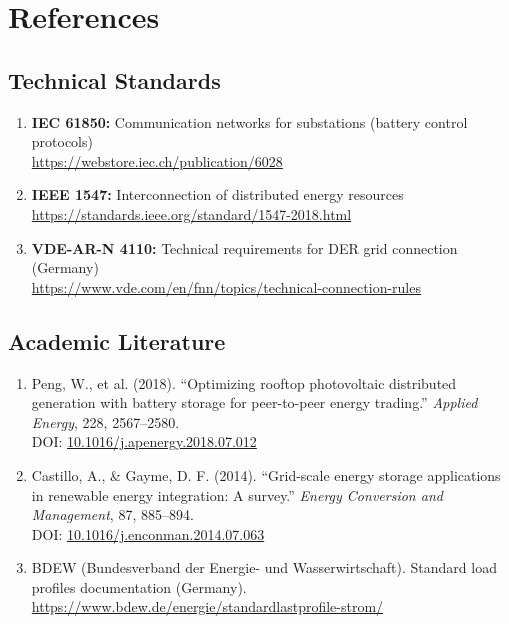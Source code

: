 \documentclass[11pt,a4paper]{article}
\begin{document}
\section{References}

\subsection{Technical Standards}

\begin{enumerate}
    \item \textbf{IEC 61850:} Communication networks for substations (battery control protocols) \\
    \href{https://webstore.iec.ch/publication/6028}{https://webstore.iec.ch/publication/6028}
    
    \item \textbf{IEEE 1547:} Interconnection of distributed energy resources \\
    \href{https://standards.ieee.org/standard/1547-2018.html}{https://standards.ieee.org/standard/1547-2018.html}
    
    \item \textbf{VDE-AR-N 4110:} Technical requirements for DER grid connection (Germany) \\
    \href{https://www.vde.com/en/fnn/topics/technical-connection-rules}{https://www.vde.com/en/fnn/topics/technical-connection-rules}
\end{enumerate}

\subsection{Academic Literature}

\begin{enumerate}
    \item Peng, W., et al. (2018). ``Optimizing rooftop photovoltaic distributed generation with battery storage for peer-to-peer energy trading.'' \textit{Applied Energy}, 228, 2567--2580. \\
    DOI: \href{https://doi.org/10.1016/j.apenergy.2018.07.012}{10.1016/j.apenergy.2018.07.012}
    
    \item Castillo, A., \& Gayme, D. F. (2014). ``Grid-scale energy storage applications in renewable energy integration: A survey.'' \textit{Energy Conversion and Management}, 87, 885--894. \\
    DOI: \href{https://doi.org/10.1016/j.enconman.2014.07.063}{10.1016/j.enconman.2014.07.063}
    
    \item BDEW (Bundesverband der Energie- und Wasserwirtschaft). Standard load profiles documentation (Germany). \\
    \href{https://www.bdew.de/energie/standardlastprofile-strom/}{https://www.bdew.de/energie/standardlastprofile-strom/}
\end{enumerate}
\end{document}
